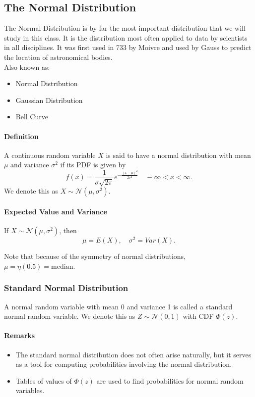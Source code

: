 \subsection{The Normal Distribution}
\hrulefill

The Normal Distribution is by far the most important distribution that we will study in this class.
It is the distribution most often applied to data by scientists in all disciplines. It was first used 
in 733 by Moivre and used by Gauss to predict the location of astronomical bodies.\\

Also known as:
\begin{itemize}
    \item Normal Distribution
    \item Gaussian Distribution
    \item Bell Curve
\end{itemize}

\paragraph*{Definition}
A continuous random variable $X$ is said to have a normal distribution with mean $\mu$ and 
variance $\sigma^2$ if its PDF is given by
\[f(x) = \frac{1}{\sigma \sqrt{2 \pi}} e^{-\frac{(x - \mu)^2}{2 \sigma^2}} \quad -\infty < x < \infty.\]
We denote this as $X \sim \mathcal{N}(\mu, \sigma^2)$.

\paragraph*{Expected Value and Variance}
If $X \sim \mathcal{N}(\mu, \sigma^2)$, then
\[\mu = E(X), \quad \sigma^2 = Var(X).\]

Note that because of the symmetry of normal distributions, $\mu = \eta(0.5) = \text{median}$.

\subsubsection*{Standard Normal Distribution}
A normal random variable with mean 0 and variance 1 is called a standard normal random variable.
We denote this as $Z \sim \mathcal{N}(0, 1)$ with CDF $\Phi(z)$.

\paragraph*{Remarks}
\begin{itemize}
    \item The standard normal distribution does not often arise naturally, but it serves as a tool for computing probabilities involving the normal distribution.
    \item Tables of values of $\Phi(z)$ are used to find probabilities for normal random variables.
\end{itemize}

